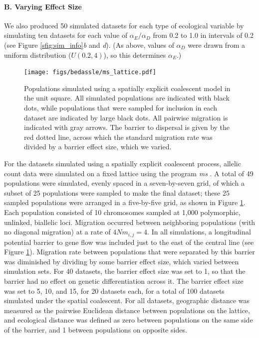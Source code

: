 \paragraph{B. Varying Effect Size} We also produced 50 simulated datasets for each type of ecological variable by simulating ten datasets for each value of $\alpha_{E}/\alpha_{D}$ from 0.2 to 1.0 in intervals of 0.2 (see Figure \ref{sfig:sim_info}\textit{b} and \textit{d}).  (As above, values of $\alpha_{D}$ were drawn from a uniform distribution ($U(0.2,4)$), so this determines $\alpha_E$.) 

\begin{figure}[ht!]
\begin{center}
  \texttt{[image: figs/bedassle/ms\_lattice.pdf]}
 \caption{
 		\textmd{Populations simulated using a spatially explicit coalescent model in the unit square.  All simulated populations are indicated with black dots, while populations that were sampled for inclusion in each dataset are indicated by large black dots.  All pairwise migration is indicated with gray arrows.  The barrier to dispersal is given by the red dotted line, across which the standard migration rate was divided by a barrier effect size, which we varied.}
	 \label{fig:ms_lattice}
  }
\end{center}
\end{figure}

For the datasets simulated using a spatially explicit coalescent process, allelic count data were simulated on a fixed lattice using the program \textit{ms} \citep{Hudson2002}.  A total of 49 populations were simulated, evenly spaced in a seven-by-seven grid, of which a subset of 25 populations were sampled to make the final dataset; these 25 sampled populations were arranged in a five-by-five grid, as shown in Figure \ref{fig:ms_lattice}.  Each population consisted of 10 chromosomes sampled at 1,000 polymorphic, unlinked, biallelic loci.  Migration occurred between neighboring populations (with no diagonal migration) at a rate of $4Nm_{i,j} = 4$.  In all simulations, a longitudinal potential barrier to gene flow was included just to the east of the central line (see Figure \ref{fig:ms_lattice}).  Migration rate between populations that were separated by this barrier was diminished by dividing by some barrier effect size, which varied between simulation sets.  For 40 datasets, the barrier effect size was set to 1, so that the barrier had no effect on genetic differentiation across it.  The barrier effect size was set to 5, 10, and 15, for 20 datasets each, for a total of 100 datasets simulated under the spatial coalescent.  For all datasets, geographic distance was measured as the pairwise Euclidean distance between populations on the lattice, and ecological distance was defined as zero between populations on the same side of the barrier, and 1 between populations on opposite sides.

